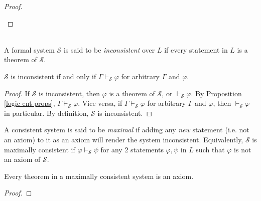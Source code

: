 \documentclass{treatise}
\begin{document}
\begin{shaded}
\begin{proof}
\begin{enumerate}[label = (\alph*)]
\end{enumerate}
\end{proof}
\ \\
A formal system $\mathcal{S}$ is said to be \emph{inconsistent} over $L$ if every statement in $L$ is a theorem of $\mathcal{S}$.
\begin{proposition}
$\mathcal{S}$ is inconsistent if and only if $\Gamma \vdash_{\mathcal{S}} \varphi$ for arbitrary $\Gamma$ and $\varphi$.
\end{proposition}
\begin{proof}
If $\mathcal{S}$ is inconsistent, then $\varphi$ is a theorem of $\mathcal{S}$, or $\vdash_{\mathcal{S}} \varphi$. By \hyperref[logic-ent-props]{Proposition \ref*{logic-ent-props}}, $\Gamma \vdash_{\mathcal{S}} \varphi$. Vice versa, if $\Gamma \vdash_{\mathcal{S}} \varphi$ for arbitrary $\Gamma$ and $\varphi$, then $\vdash_{\mathcal{S}} \varphi$ in particular. By definition, $\mathcal{S}$ is inconsistent.
\end{proof}
A consistent system is said to be \emph{maximal} if adding any \textit{new} statement (i.e. not an axiom) to it as an axiom will render the system inconsistent. Equivalently, $\mathcal{S}$ is maximally consistent if $\varphi \vdash_{\mathcal{S}} \psi$ for any 2 statements $\varphi, \psi$ in $L$ such that $\varphi$ is not an axiom of $\mathcal{S}$.
\begin{proposition}
Every theorem in a maximally consistent system is an axiom.
\end{proposition}
\begin{proof}
\end{proof}

\newpage


\end{shaded}
\end{document}

